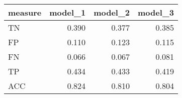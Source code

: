 \begin{tabular}{lrrr}
\toprule
measure &  model\_1 &  model\_2 &  model\_3 \\
\midrule
     TN &    0.390 &    0.377 &    0.385 \\
     FP &    0.110 &    0.123 &    0.115 \\
     FN &    0.066 &    0.067 &    0.081 \\
     TP &    0.434 &    0.433 &    0.419 \\
    ACC &    0.824 &    0.810 &    0.804 \\
\bottomrule
\end{tabular}
